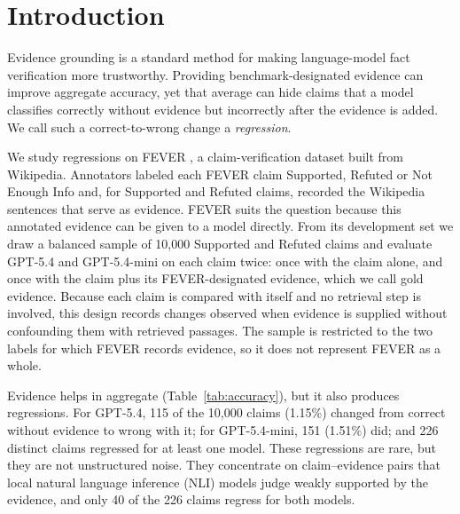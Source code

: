 \section{Introduction}
\label{sec:intro}

Evidence grounding is a standard method for making language-model fact verification more trustworthy.
Providing benchmark-designated evidence can improve aggregate accuracy, yet that average can hide claims that a model classifies correctly without evidence but incorrectly after the evidence is added.
We call such a correct-to-wrong change a \emph{regression}.

We study regressions on FEVER \citep{thorne-etal-2018-fever}, a claim-verification dataset built from Wikipedia.
Annotators labeled each FEVER claim Supported, Refuted or Not Enough Info and, for Supported and Refuted claims, recorded the Wikipedia sentences that serve as evidence.
FEVER suits the question because this annotated evidence can be given to a model directly.
From its development set we draw a balanced sample of 10{,}000 Supported and Refuted claims and evaluate GPT-5.4 and GPT-5.4-mini on each claim twice: once with the claim alone, and once with the claim plus its FEVER-designated evidence, which we call gold evidence.
Because each claim is compared with itself and no retrieval step is involved, this design records changes observed when evidence is supplied without confounding them with retrieved passages.
The sample is restricted to the two labels for which FEVER records evidence, so it does not represent FEVER as a whole.

Evidence helps in aggregate (Table~\ref{tab:accuracy}), but it also produces regressions.
For GPT-5.4, 115 of the 10{,}000 claims (1.15\%) changed from correct without evidence to wrong with it; for GPT-5.4-mini, 151 (1.51\%) did; and 226 distinct claims regressed for at least one model.
These regressions are rare, but they are not unstructured noise.
They concentrate on claim--evidence pairs that local natural language inference (NLI) models judge weakly supported by the evidence, and only 40 of the 226 claims regress for both models.

